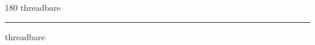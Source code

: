 
\begin{frame}
\begin{center}
\begin{turn}{180}
{\fontsize{2.5cm}{1em}\selectfont threadbare}
\end{turn}
\vspace{1em}\par  
\hrule
\vspace{1em}\par  
{\fontsize{2.5cm}{1em}\selectfont threadbare}
\end{center}
\end{frame}
